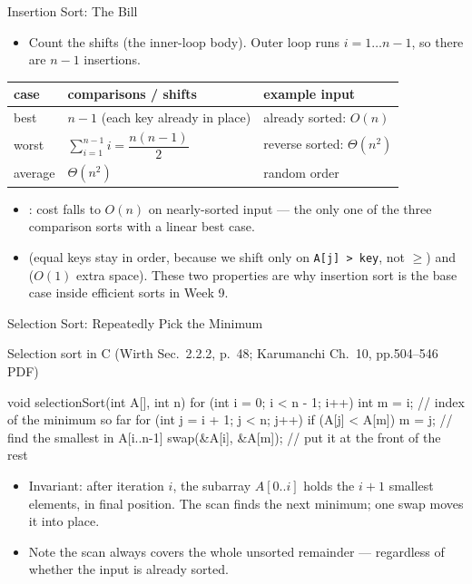 \documentclass[aspectratio=169]{beamer}
\begin{document}
\begin{frame}{Insertion Sort: The Bill}
  \begin{itemize}
    \item Count the shifts (the inner-loop body). Outer loop runs $i = 1
      \dots n-1$, so there are $n-1$ insertions.
  \end{itemize}
  \begin{center}
  {\footnotesize
  \begin{tabular}{lll}
    \toprule
    \textbf{case} & \textbf{comparisons / shifts} & \textbf{example input} \\
    \midrule
    best & $n-1$ (each key already in place) & already sorted: $O(n)$ \\
    worst & $\sum_{i=1}^{n-1} i = \dfrac{n(n-1)}{2}$ & reverse sorted: $\Theta(n^2)$ \\
    average & $\Theta(n^2)$ & random order \\
    \bottomrule
  \end{tabular}}
  \end{center}
  \begin{itemize}
    \item {}: cost falls to $O(n)$ on nearly-sorted input ---
      the only one of the three comparison sorts with a linear best case.
    \item {} (equal keys stay in order, because we shift only on
      \texttt{A[j] > key}, not $\ge$) and  ($O(1)$ extra
      space). These two properties are why insertion sort is the base case
      inside efficient sorts in Week 9.
  \end{itemize}
\end{frame}

\begin{frame}[fragile]{Selection Sort: Repeatedly Pick the Minimum}
  \footnotesize
  \begin{block}{Selection sort in C (Wirth Sec.~2.2.2, p.~48; Karumanchi
    Ch.~10, pp.504--546 PDF)
    \cite{Wirth2004_algorithms_data_structures,Karumanchi2017_data_structures_algorithms_made_easy}}
\begin{semiverbatim}
void selectionSort(int A[], int n) {
  for (int i = 0; i < n - 1; i++) {
    int m = i;                          // index of the minimum so far
    for (int j = i + 1; j < n; j++)
      if (A[j] < A[m]) m = j;           // find the smallest in A[i..n-1]
    swap(&A[i], &A[m]);                 // put it at the front of the rest
  }
}
\end{semiverbatim}
  \end{block}
  \begin{itemize}
    \item Invariant: after iteration $i$, the subarray $A[0..i]$ holds the
      $i+1$ smallest elements, in final position. The scan finds the next
      minimum; one swap moves it into place.
    \item Note the scan always covers the whole unsorted remainder ---
      regardless of whether the input is already sorted.
  \end{itemize}
\end{frame}
\end{document}
